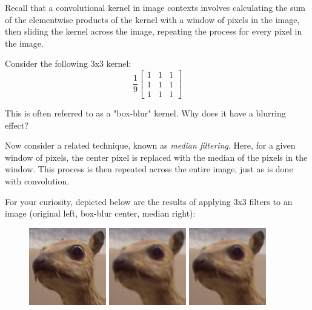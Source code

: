 \documentclass[11pt]{article}
\begin{document}

Recall that a convolutional kernel in image contexts involves calculating the sum of the elementwise products of the kernel with a window of pixels in the image, then sliding the kernel across the image, repeating the process for every pixel in the image.

\begin{subparts}
    \subpart Consider the following 3x3 kernel:
    $$\frac{1}{9} \begin{bmatrix}
    1 & 1 & 1 \\
    1 & 1 & 1 \\
    1 & 1 & 1
    \end{bmatrix}$$

    This is often referred to as a "box-blur" kernel. Why does it have a blurring effect?


    \subpart Now consider a related technique, known as \emph{median filtering}. Here, for a given window of pixels, the center pixel is replaced with the median of the pixels in the window. This process is then repeated across the entire image, just as is done with convolution.
    
    For your curiosity, depicted below are the results of applying 3x3 filters to an image (original left, box-blur center, median right):
    \begin{figure}[h] \centering
        \includegraphics[width=0.3\textwidth]{orig.png}
        \includegraphics[width=0.3\textwidth]{box_blur.png}
        \includegraphics[width=0.3\textwidth]{median_filtered.png}
    \end{figure}


\end{subparts}
\end{document}
